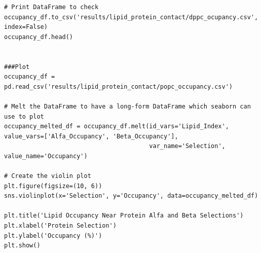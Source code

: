 \begin{lstlisting}
# Print DataFrame to check
occupancy_df.to_csv('results/lipid_protein_contact/dppc_ocupancy.csv', index=False)
occupancy_df.head()


###Plot
occupancy_df = pd.read_csv('results/lipid_protein_contact/popc_occupancy.csv')

# Melt the DataFrame to have a long-form DataFrame which seaborn can use to plot
occupancy_melted_df = occupancy_df.melt(id_vars='Lipid_Index', value_vars=['Alfa_Occupancy', 'Beta_Occupancy'],
                                        var_name='Selection', value_name='Occupancy')

# Create the violin plot
plt.figure(figsize=(10, 6))
sns.violinplot(x='Selection', y='Occupancy', data=occupancy_melted_df)

plt.title('Lipid Occupancy Near Protein Alfa and Beta Selections')
plt.xlabel('Protein Selection')
plt.ylabel('Occupancy (%)')
plt.show()

\end{lstlisting}
